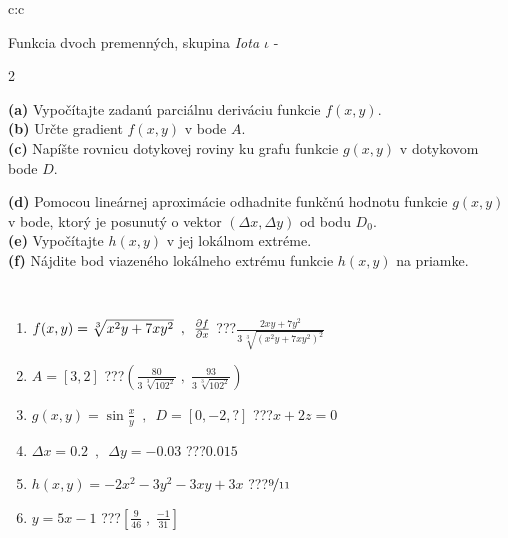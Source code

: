 \documentclass[10pt]{report}
\begin{document}
\begin{tabular}{c:c}
\begin{minipage}[c][104.5mm][t]{0.5\linewidth}
\begin{center}
\vspace{7mm}
{\huge \LARGE Funkcia dvoch premenných, skupina \textit{Iota $\iota$} -}\\[5mm]
\begin{minipage}{0.95\linewidth}
\begin{center}
{\small \begin{multicols}{2} \raggedright
\textbf{(a)} Vypočítajte zadanú parciálnu deriváciu funkcie \(f(x,y)\). \\[1mm]
\textbf{(b)} Určte gradient \(f(x,y)\) v bode \(A\). \\[1mm]
\textbf{(c)} Napíšte rovnicu dotykovej roviny ku grafu funkcie \(g(x,y)\) v dotykovom bode \(D\). \par \columnbreak
\textbf{(d)} Pomocou lineárnej aproximácie odhadnite funkčnú hodnotu funkcie \(g(x,y)\) v bode, ktorý je posunutý o vektor \((\Delta x, \Delta y)\) od bodu \(D_0\). \\[1mm]
\textbf{(e)} Vypočítajte \(h(x,y)\) v jej lokálnom extréme. \\[1mm]
\textbf{(f)} Nájdite bod viazeného lokálneho extrému funkcie \(h(x,y)\) na priamke. \\[1mm]
\end{multicols}
}
\end{center}
\end{minipage}
\\[4mm]
\begin{minipage}{0.79\linewidth}
\begin{center}
\begin{varwidth}{\linewidth}
\begin{enumerate}
\normalsizerr
\item $f(x,y) = \sqrt[3]{x^2y + 7xy^2}\enspace , \enspace \pdv{f}{x}$\quad \dotfill\; ???\;\dotfill \quad $\frac{2xy+7y^2}{3\,\sqrt[3]{(x^2y+7xy^2)^{2}}}$
\item $A = [3, 2]$\quad \dotfill\; ???\;\dotfill \quad $\left( \frac{80}{3\,\sqrt[3]{102^2}} \;,\; \frac{93}{3\,\sqrt[3]{102^2}} \right)$
\item $g(x,y) = \sin\frac{x}{y} \enspace , \enspace D = [0, -2, ?]$\quad \dotfill\; ???\;\dotfill \quad $x+2z=0$
\item $\Delta x = {0.2} \enspace,\enspace \Delta y = {-0.03}$\quad \dotfill\; ???\;\dotfill \quad $0.015$
\item $h(x,y) = -2x^2-3y^2-3xy+3x$\quad \dotfill\; ???\;\dotfill \quad $\nicefrac{9}{11}$
\item $y = 5x-1$\quad \dotfill\; ???\;\dotfill \quad $\left[\frac{9}{46}\;,\;\frac{-1}{31}\right]$

\end{enumerate}
\end{varwidth}
\end{center}
\end{minipage}
\end{center}
\end{minipage}
\end{tabular}
\end{document}
